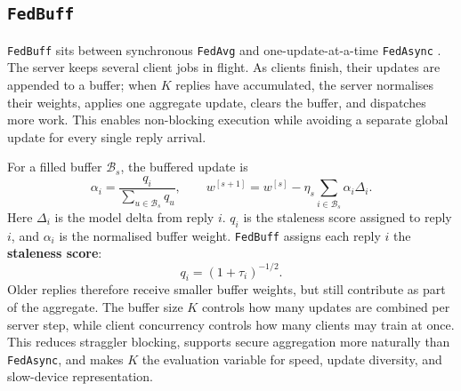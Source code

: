 \subsection{\texttt{FedBuff}}
\label{sec:fedbuff_related}

\texttt{FedBuff} sits between synchronous \texttt{FedAvg} and one-update-at-a-time \texttt{FedAsync} \parencite{nguyen2022fedbuff}. The server keeps several client jobs in flight. As clients finish, their updates are appended to a buffer; when \(K\) replies have accumulated, the server normalises their weights, applies one aggregate update, clears the buffer, and dispatches more work. This enables non-blocking execution while avoiding a separate global update for every single reply arrival.

For a filled buffer \(\mathcal{B}_s\), the buffered update is
\[
    \alpha_i = \frac{q_i}{\sum_{u\in\mathcal{B}_s} q_u},
    \qquad
    w^{[s+1]}
    =
    w^{[s]} - \eta_s
    \sum_{i\in\mathcal{B}_s}\alpha_i\Delta_i .
\]
Here \(\Delta_i\) is the model delta from reply \(i\). \(q_i\) is the staleness score assigned to reply \(i\), and \(\alpha_i\) is the normalised buffer weight. \texttt{FedBuff} assigns each reply \(i\) the \textbf{staleness score}:
\[
    q_i = (1+\tau_i)^{-1/2}.
\]
Older replies therefore receive smaller buffer weights, but still contribute as part of the aggregate. The buffer size \(K\) controls how many updates are combined per server step, while client concurrency controls how many clients may train at once. This reduces straggler blocking, supports secure aggregation more naturally than \texttt{FedAsync}, and makes \(K\) the evaluation variable for speed, update diversity, and slow-device representation.


